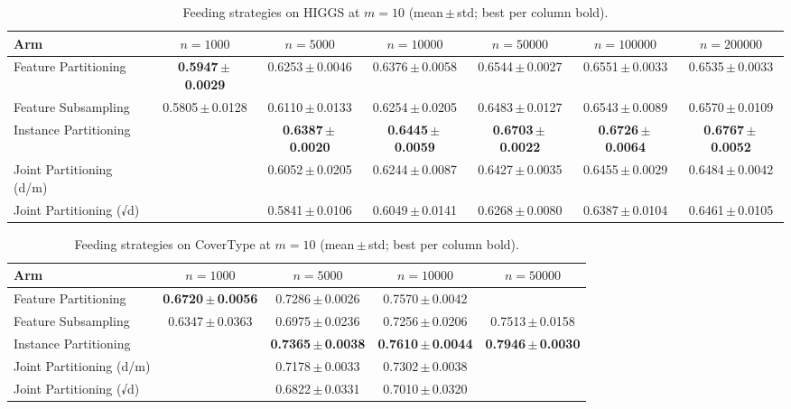 \begin{table}[ht]
\centering\small
\begin{tabular}{lcccccc}
\toprule
Arm & $n{=}1000$ & $n{=}5000$ & $n{=}10000$ & $n{=}50000$ & $n{=}100000$ & $n{=}200000$ \\
\midrule
Feature Partitioning & \textbf{0.5947\,$\pm$\,0.0029} & 0.6253\,$\pm$\,0.0046 & 0.6376\,$\pm$\,0.0058 & 0.6544\,$\pm$\,0.0027 & 0.6551\,$\pm$\,0.0033 & 0.6535\,$\pm$\,0.0033 \\
Feature Subsampling & 0.5805\,$\pm$\,0.0128 & 0.6110\,$\pm$\,0.0133 & 0.6254\,$\pm$\,0.0205 & 0.6483\,$\pm$\,0.0127 & 0.6543\,$\pm$\,0.0089 & 0.6570\,$\pm$\,0.0109 \\
Instance Partitioning &  & \textbf{0.6387\,$\pm$\,0.0020} & \textbf{0.6445\,$\pm$\,0.0059} & \textbf{0.6703\,$\pm$\,0.0022} & \textbf{0.6726\,$\pm$\,0.0064} & \textbf{0.6767\,$\pm$\,0.0052} \\
Joint Partitioning (d/m) &  & 0.6052\,$\pm$\,0.0205 & 0.6244\,$\pm$\,0.0087 & 0.6427\,$\pm$\,0.0035 & 0.6455\,$\pm$\,0.0029 & 0.6484\,$\pm$\,0.0042 \\
Joint Partitioning (√d) &  & 0.5841\,$\pm$\,0.0106 & 0.6049\,$\pm$\,0.0141 & 0.6268\,$\pm$\,0.0080 & 0.6387\,$\pm$\,0.0104 & 0.6461\,$\pm$\,0.0105 \\
\bottomrule
\end{tabular}
\caption{Feeding strategies on HIGGS at $m=10$ (mean\,$\pm$\,std; best per column bold).}
\label{tab:feed_higgs}
\end{table}

\begin{table}[ht]
\centering\small
\begin{tabular}{lcccc}
\toprule
Arm & $n{=}1000$ & $n{=}5000$ & $n{=}10000$ & $n{=}50000$ \\
\midrule
Feature Partitioning & \textbf{0.6720\,$\pm$\,0.0056} & 0.7286\,$\pm$\,0.0026 & 0.7570\,$\pm$\,0.0042 &  \\
Feature Subsampling & 0.6347\,$\pm$\,0.0363 & 0.6975\,$\pm$\,0.0236 & 0.7256\,$\pm$\,0.0206 & 0.7513\,$\pm$\,0.0158 \\
Instance Partitioning &  & \textbf{0.7365\,$\pm$\,0.0038} & \textbf{0.7610\,$\pm$\,0.0044} & \textbf{0.7946\,$\pm$\,0.0030} \\
Joint Partitioning (d/m) &  & 0.7178\,$\pm$\,0.0033 & 0.7302\,$\pm$\,0.0038 &  \\
Joint Partitioning (√d) &  & 0.6822\,$\pm$\,0.0331 & 0.7010\,$\pm$\,0.0320 &  \\
\bottomrule
\end{tabular}
\caption{Feeding strategies on CoverType at $m=10$ (mean\,$\pm$\,std; best per column bold).}
\label{tab:feed_covertype}
\end{table}

